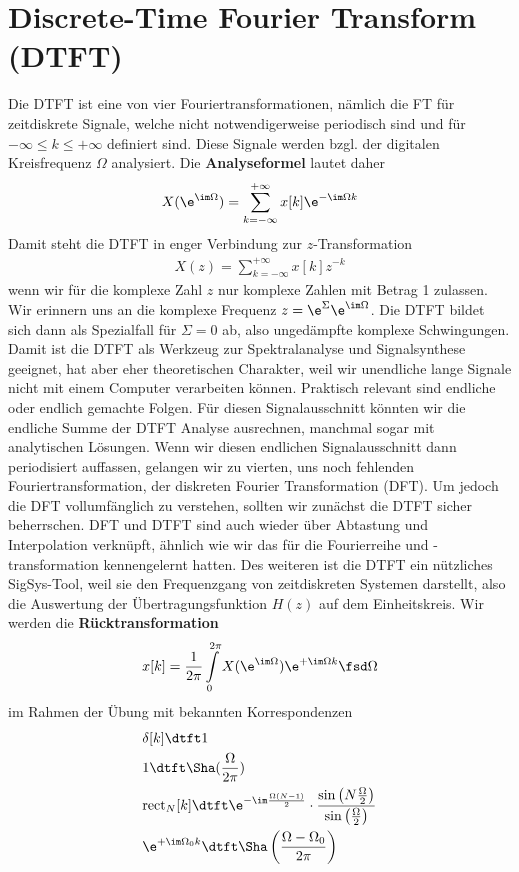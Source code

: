 \clearpage
\section{Discrete-Time Fourier Transform (DTFT)}

Die DTFT ist eine von vier Fouriertransformationen, nämlich die FT für
zeitdiskrete Signale, welche nicht notwendigerweise periodisch sind
und für $-\infty \leq k \leq +\infty$ definiert sind.
Diese Signale werden bzgl. der digitalen Kreisfrequenz $\Omega$ analysiert.
%
Die \textbf{Analyseformel} lautet daher
\begin{align}
X(\e^{\im\Omega}) = \sum\limits_{k=-\infty}^{+\infty} x[k] \e^{-\im\Omega k}
\end{align}
%
Damit steht die DTFT in enger Verbindung zur $z$-Transformation
\begin{align}
X(z) = \sum\limits_{k=-\infty}^{+\infty} x[k] z^{-k}
\end{align}
wenn wir für die komplexe Zahl $z$ nur komplexe Zahlen mit Betrag 1 zulassen.
%
Wir erinnern uns an die komplexe Frequenz $z=\e^\Sigma \e^{\im\Omega}$.
%
Die DTFT bildet sich dann als Spezialfall für $\Sigma=0$ ab, also ungedämpfte
komplexe Schwingungen.
%
Damit ist die DTFT als Werkzeug zur Spektralanalyse und Signalsynthese geeignet,
hat aber eher theoretischen Charakter, weil wir unendliche lange Signale
nicht mit einem Computer verarbeiten können.
%
Praktisch relevant sind endliche oder endlich gemachte Folgen.
%
Für diesen Signalausschnitt könnten wir die endliche Summe der DTFT Analyse
ausrechnen, manchmal sogar mit analytischen Lösungen.
%
Wenn wir diesen endlichen Signalausschnitt dann periodisiert auffassen,
gelangen wir zu vierten, uns noch fehlenden Fouriertransformation, der diskreten
Fourier Transformation (DFT).
%
Um jedoch die DFT vollumfänglich zu verstehen, sollten wir zunächst die DTFT
sicher beherrschen.
%
DFT und DTFT sind auch wieder über Abtastung und Interpolation
verknüpft, ähnlich wie wir das für die Fourierreihe und -transformation
kennengelernt hatten.
%
Des weiteren ist die DTFT ein nützliches SigSys-Tool, weil
sie den Frequenzgang von zeitdiskreten Systemen darstellt, also die Auswertung
der Übertragungsfunktion $H(z)$ auf dem Einheitskreis.
%
Wir werden die \textbf{Rücktransformation}
\begin{align}
x[k] = \frac{1}{2\pi} \int\limits_{0}^{2\pi} X(\e^{\im\Omega}) \e^{+\im\Omega k} \fsd \Omega
\end{align}
im Rahmen der Übung mit bekannten Korrespondenzen
\begin{align}
&\delta[k] \dtft 1\\
&1 \dtft \Sha(\frac{\Omega}{2\pi})\\
&\mathrm{rect}_N[k]
\dtft
\e^{-\im\frac{\Omega(N-1)}{2}}\cdot\frac{\sin\left(N\frac{\Omega}{2}\right)}{\sin\left(\frac{\Omega}{2}\right)}\\
&\e^{+\im \Omega_0 k} \dtft \Sha\left(\frac{\Omega-\Omega_0}{2\pi}\right)
\end{align}
